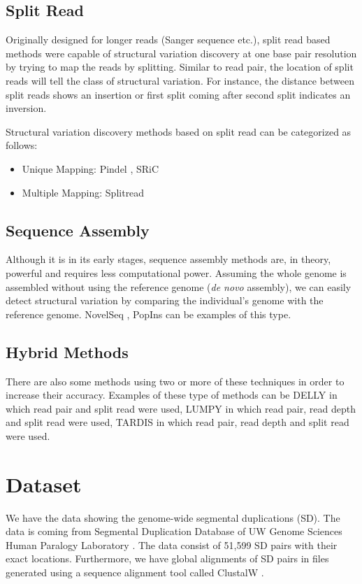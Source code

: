 \subsection{Split Read}
Originally designed for longer reads (Sanger sequence etc.), split read based methods were capable of structural variation discovery at one base pair resolution by trying to map the reads by splitting. Similar to read pair, the location of split reads will tell the class of structural variation. For instance, the distance between split reads shows an insertion or first split coming after second split indicates an inversion.

Structural variation discovery methods based on split read can be categorized as follows:
\begin{itemize}
    \item Unique Mapping: Pindel \cite{ye2009pindel}, SRiC \cite{zhang2011identification}
    \item Multiple Mapping: Splitread \cite{karakoc2012detection}
\end{itemize}

\subsection{Sequence Assembly} 
Although it is in its early stages, sequence assembly methods are, in theory, powerful and requires less computational power. Assuming the whole genome is assembled without using the reference genome (\textit{de novo} assembly), we can easily detect structural variation by comparing the individual's genome with the reference genome. NovelSeq \cite{hajirasouliha2010detection}, PopIns \cite{kehr2015popins} can be examples of this type.

\subsection{Hybrid Methods}
There are also some methods using two or more of these techniques in order to increase their accuracy. Examples of these type of methods can be DELLY \cite{rausch2012delly} in which read pair and split read were used, LUMPY \cite{layer2014lumpy} in which read pair, read depth and split read were used, TARDIS \cite{soylev2017toolkit} in which read pair, read depth and split read were used.

\section{Dataset}
We have the data showing the genome-wide segmental duplications (SD). The data is coming from Segmental Duplication Database of UW Genome Sciences Human Paralogy Laboratory \cite{she2004shotgun, bailey2002recent}. The data consist of 51,599 SD pairs with their exact locations. Furthermore, we have global alignments of SD pairs in files generated using a sequence alignment tool called ClustalW \cite{thompson1994clustal}.

